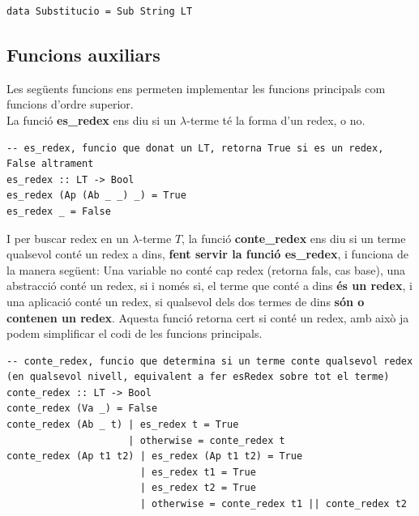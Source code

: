 \documentclass[10pt,a4paper]{article}
\begin{document}
\lstset{language=Haskell, breaklines=true, basicstyle=\footnotesize}
\begin{lstlisting}[frame=mystyle]
data Substitucio = Sub String LT
\end{lstlisting}

\clearpage

\subsection{Funcions auxiliars}

Les següents funcions ens permeten implementar les funcions principals com funcions d'ordre superior. \\

La funció \textbf{es\_redex} ens diu si un $\lambda$-terme té la forma d'un redex, o no.

\lstset{language=Haskell, breaklines=true, basicstyle=\footnotesize}
\begin{lstlisting}[frame=mystyle]
-- es_redex, funcio que donat un LT, retorna True si es un redex, False altrament
es_redex :: LT -> Bool
es_redex (Ap (Ab _ _) _) = True
es_redex _ = False
\end{lstlisting}

I per buscar redex en un $\lambda$-terme $T$, la funció \textbf{conte\_redex} ens diu si un terme qualsevol conté un redex a dins, \textbf{fent servir la funció es\_redex}, i funciona de la manera següent: Una variable no conté cap redex (retorna fals, cas base), una abstracció conté un redex, si i només si, el terme que conté a dins \textbf{és un redex}, i una aplicació conté un redex, si qualsevol dels dos termes de dins \textbf{són o contenen un redex}. Aquesta funció retorna cert si conté un redex, amb això ja podem simplificar el codi de les funcions principals.

\lstset{language=Haskell, breaklines=true, basicstyle=\footnotesize}
\begin{lstlisting}[frame=mystyle]
-- conte_redex, funcio que determina si un terme conte qualsevol redex (en qualsevol nivell, equivalent a fer esRedex sobre tot el terme)
conte_redex :: LT -> Bool
conte_redex (Va _) = False
conte_redex (Ab _ t) | es_redex t = True
                     | otherwise = conte_redex t
conte_redex (Ap t1 t2) | es_redex (Ap t1 t2) = True
                       | es_redex t1 = True
                       | es_redex t2 = True
                       | otherwise = conte_redex t1 || conte_redex t2
\end{lstlisting}
\end{document}
